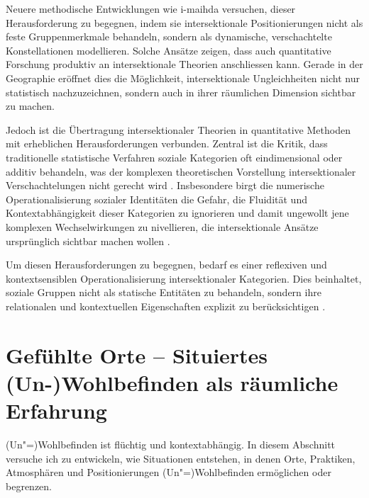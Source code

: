Neuere methodische Entwicklungen wie \gls{i-maihda} \parencite[\gls{ua}][]{evansMultilevelApproachModeling2018,bellExtendingIntersectionalMultilevel2023} versuchen, dieser Herausforderung zu begegnen, indem sie intersektionale Positionierungen nicht als feste Gruppenmerkmale behandeln, sondern als dynamische, verschachtelte Konstellationen modellieren. Solche Ansätze zeigen, dass auch quantitative Forschung produktiv an intersektionale Theorien anschliessen kann. Gerade in der Geographie eröffnet dies die Möglichkeit, intersektionale Ungleichheiten nicht nur statistisch nachzuzeichnen, sondern auch in ihrer räumlichen Dimension sichtbar zu machen.

Jedoch ist die Übertragung intersektionaler Theorien in quantitative Methoden mit erheblichen Herausforderungen verbunden. Zentral ist die Kritik, dass traditionelle statistische Verfahren soziale Kategorien oft eindimensional oder additiv behandeln, was der komplexen theoretischen Vorstellung intersektionaler Verschachtelungen nicht gerecht wird \parencite{hancockWhenMultiplicationDoesnt2007, bowlegInvitedReflectionQuantifying2016}. Insbesondere birgt die numerische Operationalisierung sozialer Identitäten die Gefahr, die Fluidität und Kontextabhängigkeit dieser Kategorien zu ignorieren und damit ungewollt jene komplexen Wechselwirkungen zu nivellieren, die intersektionale Ansätze ursprünglich sichtbar machen wollen \parencite{scottIntersectionalityQuantitativeMethods2017}.

Um diesen Herausforderungen zu begegnen, bedarf es einer reflexiven und kontextsensiblen Operationalisierung intersektionaler Kategorien. Dies beinhaltet, soziale Gruppen nicht als statische Entitäten zu behandeln, sondern ihre relationalen und kontextuellen Eigenschaften explizit zu berücksichtigen \parencite{rodo-de-zarateDevelopingGeographiesIntersectionality2014, websterCenteringSocialtechnicalRelations2021}.


\section{Gefühlte Orte -- Situiertes (Un-)Wohlbefinden als räumliche Erfahrung}

(Un\nobreakdash"=)Wohlbefinden ist flüchtig und kontextabhängig. In diesem Abschnitt versuche ich zu entwickeln, wie Situationen entstehen, in denen Orte, Praktiken, Atmosphären und Positionierungen (Un\nobreakdash"=)Wohlbefinden ermöglichen oder begrenzen.

